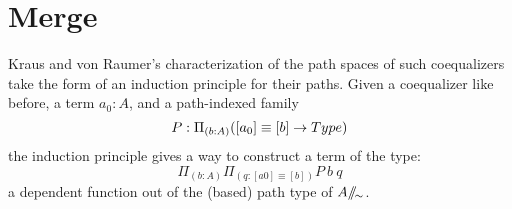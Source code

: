 \begin{code}%
\>[0]\AgdaSpace{}%
\AgdaSpace{}%
\AgdaSymbol{(}\AgdaSpace{}%
\AgdaSymbol{:}\AgdaSpace{}%
\AgdaSymbol{)}\AgdaSpace{}%
\<%
\\
\>[0][@{}l@{\AgdaIndent{0}}]%
\>[2]\AgdaSpace{}%
\AgdaSpace{}%
\AgdaSymbol{:}\AgdaSpace{}%
\AgdaSpace{}%
\<%
\\
\>[2][@{}l@{\AgdaIndent{0}}]%
\>[4]\AgdaSpace{}%
\AgdaSymbol{:}\AgdaSpace{}%
\<%
\\
%
\>[4]%
\>[12]\AgdaSymbol{:}\AgdaSpace{}%
\AgdaSpace{}%
\AgdaSpace{}%
\<%
\\
%
\\[\AgdaEmptyExtraSkip]%
%
\>[2]\AgdaSpace{}%
\AgdaSpace{}%
\AgdaSymbol{:}\AgdaSpace{}%
\AgdaSpace{}%
\<%
\\
\>[2][@{}l@{\AgdaIndent{0}}]%
\>[4]\AgdaOperator{\AgdaInductiveConstructor{[\AgdaUnderscore{}]}}\AgdaSpace{}%
\AgdaSymbol{:}\AgdaSpace{}%
\AgdaSpace{}%
\AgdaSpace{}%
\<%
\\
%
\>[4]%
\>[12]\AgdaSymbol{:}\AgdaSpace{}%
\AgdaSpace{}%
\AgdaSpace{}%
\AgdaSpace{}%
\AgdaOperator{\AgdaInductiveConstructor{[}}\AgdaSpace{}%
\AgdaSpace{}%
\AgdaOperator{\AgdaInductiveConstructor{]}}\AgdaSpace{}%
\AgdaSpace{}%
\AgdaOperator{\AgdaInductiveConstructor{[}}\AgdaSpace{}%
\AgdaSpace{}%
\AgdaSpace{}%
\AgdaOperator{\AgdaInductiveConstructor{]}}\<%
\end{code}
\section{Merge}

Kraus and von Raumer's characterization of the path spaces of such coequalizers
take the form of an induction principle for their paths. Given a coequalizer
like before, a term $a_0 : A$, and a path-indexed family
\[P : \Pi_{(b : A)} ([a_0] \equiv [b] \rightarrow Type)\]
the induction principle gives a way to construct a term of the type:
\[\Pi_{(b : A)} \Pi_{(q : [a0] \equiv [b])} P~b~q\]
a dependent function out of the (based) path type of $A /\!\!/\!_{\sim}$.


